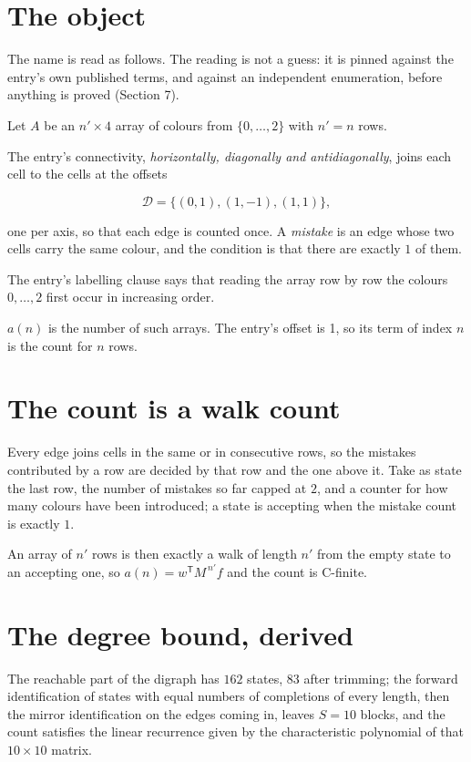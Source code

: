 \documentclass[11pt]{article}
\theoremstyle{definition}
\begin{document}
\section{The object}

The name is read as follows. The reading is not a guess: it is pinned against the entry's own published terms, and against an independent enumeration, before anything is proved (Section 7).

Let $A$ be an $n' \times 4$ array of colours from $\{0,\dots,2\}$ with $n' = n$ rows.

The entry's connectivity, {\itshape horizontally, diagonally and antidiagonally}, joins each cell to the cells at the offsets

\[\mathcal{D} = \{(0,1), (1,-1), (1,1)\},\]

one per axis, so that each edge is counted once. A {\itshape mistake} is an edge whose two cells carry the same colour, and the condition is that there are exactly $1$ of them.

The entry's labelling clause says that reading the array row by row the colours $0,\dots,2$ first occur in increasing order.

$a(n)$ is the number of such arrays. The entry's offset is 1, so its term of index $n$ is the count for $n$ rows.

\section{The count is a walk count}

Every edge joins cells in the same or in consecutive rows, so the mistakes contributed by a row are decided by that row and the one above it. Take as state the last row, the number of mistakes so far capped at $2$, and a counter for how many colours have been introduced; a state is accepting when the mistake count is exactly $1$.

An array of $n'$ rows is then exactly a walk of length $n'$ from the empty state to an accepting one, so $a(n) = w^{\mathsf T}M^{\,n'}f$ and the count is C-finite.

\section{The degree bound, derived}

The reachable part of the digraph has $162$ states, $83$ after trimming; the forward identification of states with equal numbers of completions of every length, then the mirror identification on the edges coming in, leaves $S = 10$ blocks, and the count satisfies the linear recurrence given by the characteristic polynomial of that $10\times10$ matrix.
\end{document}

